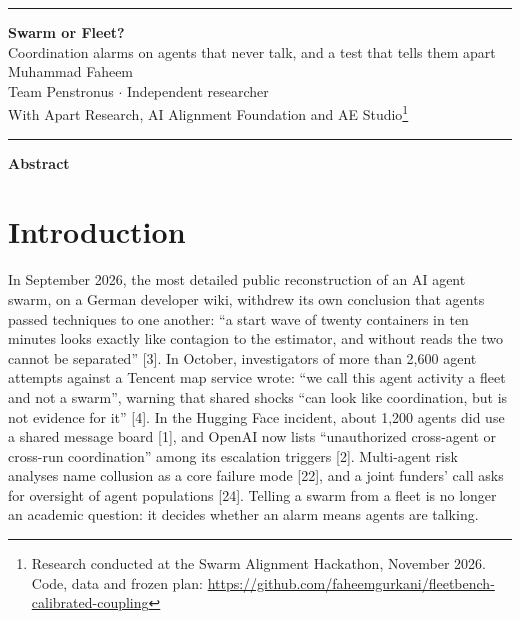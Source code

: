 \documentclass[11pt,letterpaper]{article}
\begin{document}
\noindent\rule{\textwidth}{2pt}
\begin{center}
{\LARGE\bfseries Swarm or Fleet?}\\[5pt]
{\large Coordination alarms on agents that never talk, and a test that tells them apart}\\[10pt]
Muhammad Faheem\\
Team Penstronus $\cdot$ Independent researcher\\[4pt]
With Apart Research, AI Alignment Foundation and AE Studio\footnote{Research conducted at the Swarm Alignment Hackathon, November 2026. Code, data and frozen plan: \url{https://github.com/faheemgurkani/fleetbench-calibrated-coupling}}
\end{center}
\noindent\rule{\textwidth}{0.6pt}

\begin{center}\textbf{Abstract}\end{center}
\vspace{-4pt}
\begin{quote}

\end{quote}

\section{Introduction}

In September 2026, the most detailed public reconstruction of an AI agent swarm, on a German developer wiki, withdrew its own conclusion that agents passed techniques to one another: ``a start wave of twenty containers in ten minutes looks exactly like contagion to the estimator, and without reads the two cannot be separated'' [3]. In October, investigators of more than 2,600 agent attempts against a Tencent map service wrote: ``we call this agent activity a fleet and not a swarm'', warning that shared shocks ``can look like coordination, but is not evidence for it'' [4]. In the Hugging Face incident, about 1,200 agents did use a shared message board [1], and OpenAI now lists ``unauthorized cross-agent or cross-run coordination'' among its escalation triggers [2]. Multi-agent risk analyses name collusion as a core failure mode [22], and a joint funders' call asks for oversight of agent populations [24]. Telling a swarm from a fleet is no longer an academic question: it decides whether an alarm means agents are talking.
\end{document}
